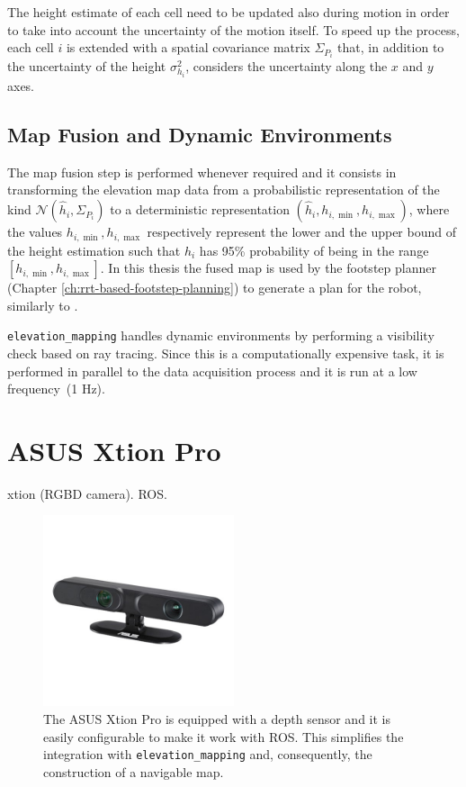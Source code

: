 The height estimate of each cell need to be updated also during motion in 
order to take  
into account the uncertainty of the motion itself. To speed up the process,
each cell $i$ is extended with a spatial covariance matrix $\Sigma_{P_i}$ that,
in addition to the uncertainty of the height $\sigma_{h_i}^2$,
considers the uncertainty along the $x$ and $y$ axes.

\subsection{Map Fusion and Dynamic Environments}
The map fusion step is performed whenever required and it consists in 
transforming the elevation map data from a probabilistic representation of the 
kind $\mathcal{N}(\hat{h}_i, \Sigma_{P_i})$ to a deterministic representation 
$(\hat{h}_i, h_{i,\min}, h_{i,\max})$, where the values $h_{i,\min}, h_{i,\max}$
respectively represent the lower and the upper bound of the height estimation 
such that $h_i$ has 95\% probability of being in the range $[h_{i,\min},
h_{i,\max}]$. In this thesis the fused map is used by the footstep planner 
(Chapter \ref{ch:rrt-based-footstep-planning}) to generate a plan for the robot,
similarly to \cite{Fankauser2018RobustRoughTerrainLocomotion}.

\texttt{elevation\_mapping} handles dynamic environments by performing a 
visibility check based on ray tracing. Since this is a computationally 
expensive task, it is performed in parallel to the data acquisition process and 
it is run at a low frequency~(1 Hz).

\section{ASUS Xtion Pro}
xtion (RGBD camera). ROS.
\begin{figure}
  \centering
  \includegraphics[width=0.5\textwidth]{figures/asus-xtion-pro.jpeg}
  \caption{The ASUS Xtion Pro \cite{ASUSXtionProWebsite} is equipped with a
      depth sensor and it is 
      easily configurable to make it work with ROS. This simplifies the 
      integration with \texttt{elevation\_mapping} and, consequently, 
      the construction of a navigable map.}
  \label{fig:asus-xtion-pro}
\end{figure}

